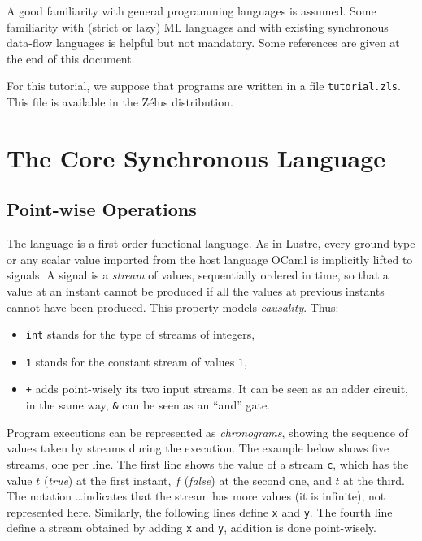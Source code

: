 \documentclass[11pt,titlepage,twoside]{report}
\newcommand{\zelus}{{\sf Z\'elus}}
\newcommand{\lustre}{{\sf Lustre}}
\newcommand{\ocaml}{{\sf OCaml}}
\begin{document}
A good familiarity with general programming
languages is assumed. Some familiarity with (strict or lazy) ML
languages and with existing synchronous data-flow languages is
helpful but not mandatory. Some references are given at the end of this document.

For this tutorial, we suppose that programs are written in a file
\verb-tutorial.zls-. This file is available in the \zelus{} distribution.

\section{The Core Synchronous Language}

\subsection{Point-wise Operations}
The language is a first-order functional language. As in \lustre,
every ground type or any scalar value imported from the host language
\ocaml{} is implicitly lifted to signals. A signal is a \emph{stream}
of values, sequentially ordered in time, so that a value at an instant
cannot be produced if all the values at previous instants cannot have
been produced. This property models \emph{causality}. Thus:
\begin{itemize}
\item \verb-int- stands for the type of streams of integers,
\item \verb-1- stands for the  constant stream of values $1$,
\item \verb-+- adds point-wisely its two input streams. It can be seen
  as an adder circuit, in the same way, \verb-&- can be seen as an
  ``and'' gate. \\
\end{itemize}
Program executions can be represented as {\em chronograms}, showing
the sequence of values taken by streams during the execution. The
example below shows five streams, one per line. The first line shows
the value of a stream {\tt c}, which has the value $t$ ({\em true}) at the
first instant, $f$ ({\em false}) at the second one, and $t$ at the
third. The notation \dots indicates that the stream has more values
(it is infinite), not represented here. Similarly, the following lines
define {\tt x} and {\tt y}. The fourth line define a stream obtained
by adding {\tt x} and {\tt y}, addition is done point-wisely.
\end{document}
